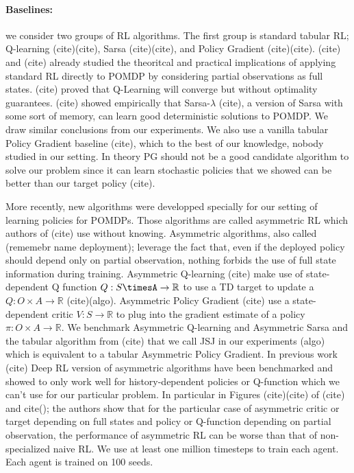 \paragraph{Baselines:} we consider two groups of RL algorithms. The first group is standard tabular RL; Q-learning (cite)(cite), Sarsa (cite)(cite), and Policy Gradient (cite)(cite).
(cite) and (cite) already studied the theoritcal and practical implications of applying standard RL directly to POMDP by considering partial observations as full states.
(cite) proved that Q-Learning will converge but without optimality guarantees. 
(cite) showed empirically that Sarsa-$\lambda$ (cite), a version of Sarsa with some sort of memory, can learn good deterministic solutions to POMDP.
We draw similar conclusions from our experiments. 
We also use a vanilla tabular Policy Gradient baseline (cite), which to the best of our knowledge, nobody studied in our setting.
In theory PG should not be a good candidate algorithm to solve our problem since it can learn stochastic policies that we showed can be better than our target policy (cite).


More recently, new algorithms were developped specially for our setting of learning policies for POMDPs. Those algorithms are called asymmetric RL which authors of (cite) use without knowing. 
Asymmetric algorithms, also called (rememebr name deployment); leverage the fact that, even if the deployed policy should depend only on partial observation, nothing forbids the use of full state information during training.
Asymmetric Q-learning (cite) make use of state-dependent Q function $Q:S\timesA \rightarrow \mathbb{R}$ to use a TD target to update a $Q:O\times A\rightarrow \mathbb{R}$ (cite)(algo).    
Asymmetric Policy Gradient (cite) use a state-dependent critic $V:S\rightarrow \mathbb{R}$ to plug into the gradient estimate of a policy $\pi:O\times A \rightarrow \mathbb{R}$.
We benchmark Asymmetric Q-learning and Asymmetric Sarsa and the tabular algorithm from (cite) that we call JSJ in our experiments (algo) which is equivalent to a tabular Asymmetric Policy Gradient.
In previous work (cite) Deep RL version of asymmetric algorithms have been benchmarked and showed to only work well for history-dependent policies or Q-function which we can't use for our particular problem.
In particular in Figures (cite)(cite) of (cite) and cite(); the authors show that for the particular case of asymmetric critic or target depending on full states and policy or Q-function depending on partial observation, the performance of asymmetric RL can be worse than that of non-specialized naive RL.
We use at least one million timesteps to train each agent. Each agent is trained on 100 seeds.  

